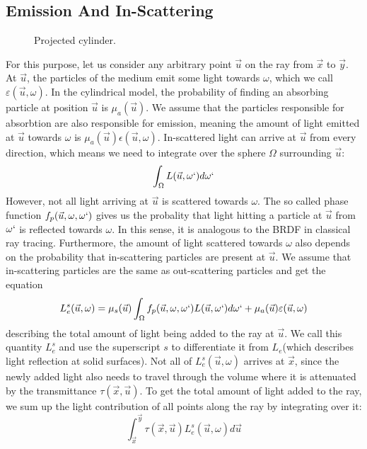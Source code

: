 \subsection{Emission And In-Scattering}
\begin{figure}
\centering
\def\svgwidth{\columnwidth}


  \caption{\label{fig:light_changes}
         Projected cylinder.}
\end{figure}
For this purpose, let us consider any arbitrary point $\vec{u}$ on the ray from $\vec{x}$ to $\vec{y}$.
At $\vec{u}$, the particles of the medium emit some light towards $\omega$\cite{468400}, which we call $\varepsilon (\vec{u}, \omega )$. In the cylindrical model, the probability of finding an absorbing particle at position $\vec{u}$ is ${\mu}_a(\vec{u})$. We assume that the particles responsible for absorbtion are also responsible for emission\cite{468400}, meaning the amount of light emitted at $\vec{u}$ towards $\omega$ is ${\mu}_a(\vec{u})\epsilon (\vec{u}, \omega )$.
In-scattered light can arrive at $\vec{u}$ from every direction, which means we need to integrate over the sphere $\Omega$ surrounding $\vec{u}$\cite{10.1145/280814.280925}:
\begin{equation}
\int_{\Omega} L(\vec{u}, \omega `)d\omega `
\end{equation}
However, not all light arriving at $\vec{u}$ is scattered towards $\omega $. The so called phase function $f_p(\vec{u}, \omega , \omega `)$ gives us the probality that light hitting a particle at $\vec{u}$ from $\omega `$ is reflected towards $\omega$\cite{10.1145/280814.280925}. In this sense, it is analogous to the BRDF in classical ray tracing. Furthermore, the amount of light scattered towards $\omega $ also depends on the probability that in-scattering particles are present at $\vec{u}$\cite{10.1145/280814.280925}. We assume that in-scattering particles are the same as out-scattering particles and get the equation
\begin{equation}
L_e^s(\vec{u}, \omega ) = {\mu}_s(\vec{u})\int_{\Omega} f_p(\vec{u}, \omega , \omega `)L(\vec{u}, \omega `)d\omega `  + {\mu}_a(\vec{u})\varepsilon (\vec{u}, \omega )
\end{equation}
describing the total amount of light being added to the ray at $\vec{u}$. We call this quantity $L_e^s$ and use the superscript $s$ to differentiate it from $L_e$(which describes light reflection at solid surfaces).
Not all of $L_e^s(\vec{u}, \omega )$ arrives at $\vec{x}$, since the newly added light also needs to travel through the volume where it is attenuated by the transmittance $\tau (\vec{x}, \vec{u})$.
To get the total amount of light added to the ray, we sum up the light contribution of all points along the ray by integrating over it\cite{zhou2007real-time}:
\begin{equation}
\int_{\vec{x}}^{\vec{y}} \tau(\vec{x}, \vec{u})L_e^s(\vec{u}, \omega )d\vec{u}
\end{equation}
